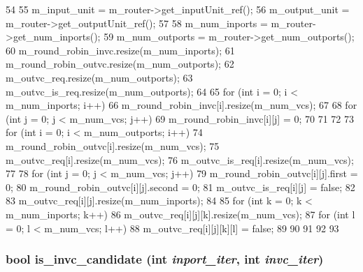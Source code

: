 \begin{DoxyCode}
54 {
55     m_input_unit = m_router->get_inputUnit_ref();
56     m_output_unit = m_router->get_outputUnit_ref();
57 
58     m_num_inports = m_router->get_num_inports();
59     m_num_outports = m_router->get_num_outports();
60     m_round_robin_invc.resize(m_num_inports);
61     m_round_robin_outvc.resize(m_num_outports);
62     m_outvc_req.resize(m_num_outports);
63     m_outvc_is_req.resize(m_num_outports);
64 
65     for (int i = 0; i < m_num_inports; i++) {
66         m_round_robin_invc[i].resize(m_num_vcs);
67 
68         for (int j = 0; j < m_num_vcs; j++) {
69             m_round_robin_invc[i][j] = 0;
70         }
71     }
72 
73     for (int i = 0; i < m_num_outports; i++) {
74         m_round_robin_outvc[i].resize(m_num_vcs);
75         m_outvc_req[i].resize(m_num_vcs);
76         m_outvc_is_req[i].resize(m_num_vcs);
77 
78         for (int j = 0; j < m_num_vcs; j++) {
79             m_round_robin_outvc[i][j].first = 0;
80             m_round_robin_outvc[i][j].second = 0;
81             m_outvc_is_req[i][j] = false;
82 
83             m_outvc_req[i][j].resize(m_num_inports);
84 
85             for (int k = 0; k < m_num_inports; k++) {
86                 m_outvc_req[i][j][k].resize(m_num_vcs);
87                 for (int l = 0; l < m_num_vcs; l++) {
88                     m_outvc_req[i][j][k][l] = false;
89                 }
90             }
91         }
92     }
93 }
\end{DoxyCode}
\hypertarget{classVCallocator__d_adb47909581756985840bfc56ab905702}{
\subsubsection[{is\_\-invc\_\-candidate}]{\setlength{\rightskip}{0pt plus 5cm}bool is\_\-invc\_\-candidate (int {\em inport\_\-iter}, \/  int {\em invc\_\-iter})}}
\label{classVCallocator__d_adb47909581756985840bfc56ab905702}



